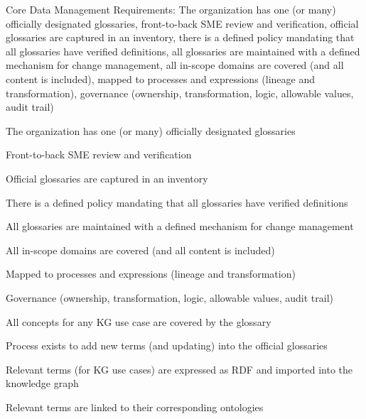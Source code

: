 \kgmmscoringsection

Core Data Management Requirements: The organization has one (or many) officially designated glossaries,
front-to-back SME review and verification, official glossaries are captured in an inventory,
there is a defined policy mandating that all glossaries have verified definitions,
all glossaries are maintained with a defined mechanism for change management,
all in-scope domains are covered (and all content is included), mapped to processes and expressions
(lineage and transformation), governance (ownership, transformation, logic, allowable values, audit trail)

\begin{scoring}

  \item The organization has one (or many) officially designated glossaries
  \item Front-to-back SME review and verification
  \item Official glossaries are captured in an inventory
  \item There is a defined policy mandating that all glossaries have verified definitions
  \item All glossaries are maintained with a defined mechanism for change management
  \item All in-scope domains are covered (and all content is included)
  \item Mapped to processes and expressions (lineage and transformation)
  \item Governance (ownership, transformation, logic, allowable values, audit trail)

\end{scoring}

\kgmmscoringlevelOne

\begin{scoring}

  \item All concepts for any KG use case are covered by the glossary
  \item Process exists to add new terms (and updating) into the official glossaries

\end{scoring}

\kgmmscoringlevelTwo

\begin{scoring}

  \item Relevant terms (for KG use cases) are expressed as RDF and imported into the knowledge graph
  \item Relevant terms are linked to their corresponding ontologies

\end{scoring}

